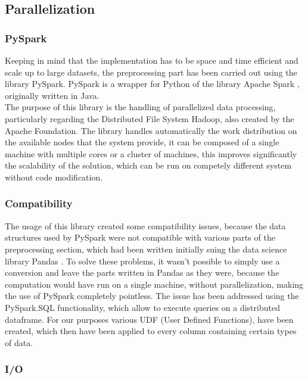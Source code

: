 \documentclass[
	letterpaper, %
	10pt, %
]{class}
\begin{document}
\subsection{Parallelization}

\subsubsection{PySpark}
Keeping in mind that the implementation has to be space and time efficient and scale up to large datasets, the preprocessing part has been carried out using the library PySpark.
PySpark is a wrapper for Python of the library Apache Spark \cite{spark}, originally written in Java.\\

The purpose of this library is the handling of parallelized data processing, particularly regarding the Distributed File System Hadoop, also created by the Apache Foundation.
The library handles automatically the work distribution on the available nodes that the system provide, it can be composed of a single machine with multiple cores or a cluster of machines, this improves significantly the scalability of the solution, which can be run on competely different system without code modification.\\

\subsubsection{Compatibility}

The usage of this library created some compatibility issues, because the data structures used by PySpark were not compatible with various parts of the preprocessing section, which had been written initially suing the data science library Pandas \cite{pandas}.
To solve these problems, it wasn't possible to simply use a conversion and leave the parts written in Pandas as they were, because the computation would have run on a single machine, without parallelization, making the use of PySpark completely pointless.
The issue has been addressed using the PySpark.SQL functionality, which allow to execute queries on a distributed dataframe. For our purposes various UDF (User Defined Functions), have been created, which then have been applied to every column containing certain types of data.\\

\subsubsection{I/O}
\end{document}
